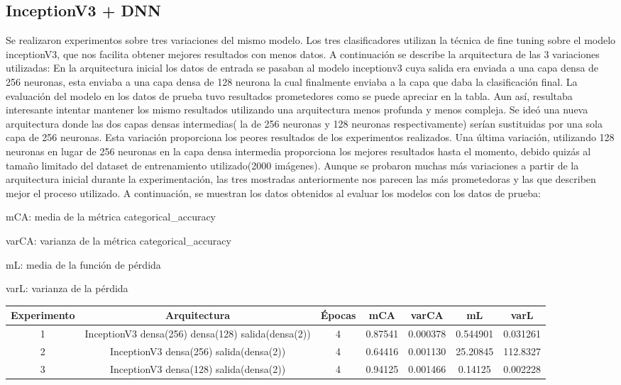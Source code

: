 \documentclass[article]{llncs}
\begin{document}
\subsection{InceptionV3 + DNN}

Se realizaron experimentos sobre tres variaciones del mismo modelo. Los tres clasificadores utilizan la técnica de fine tuning
sobre el modelo inceptionV3, que nos facilita obtener mejores resultados con menos datos. A continuación se describe la 
arquitectura de las 3 variaciones utilizadas:  
En la arquitectura inicial los datos de entrada se pasaban al modelo inceptionv3 cuya salida era enviada a una capa densa de 
256 neuronas, esta enviaba a una capa densa de 128 neurona la cual finalmente enviaba a la capa que daba la clasificación 
final. La evaluación del modelo en los datos de prueba tuvo resultados prometedores como se puede apreciar en la tabla. Aun 
así, resultaba interesante intentar mantener los mismo resultados utilizando una arquitectura menos profunda y menos 
compleja. Se ideó una nueva arquitectura donde las dos capas densas intermedias( la de 256 neuronas y 128 neuronas 
respectivamente) serían sustituidas por una sola capa de 256 neuronas. Esta variación proporciona los peores resultados de 
los experimentos realizados. Una última variación, utilizando 128 neuronas en lugar de 256 neuronas en la capa densa 
intermedia proporciona los mejores resultados hasta el momento, debido quizás al tamaño limitado del dataset de entrenamiento 
utilizado(2000 imágenes). Aunque se probaron muchas más variaciones a partir de la arquitectura inicial durante la 
experimentación, las tres mostradas anteriormente nos parecen las más prometedoras y las que describen mejor el proceso 
utilizado.  
A continuación, se muestran los datos obtenidos al evaluar los modelos con los datos de prueba:

mCA: media de la métrica categorical\_accuracy

varCA: varianza de la métrica categorical\_accuracy  

mL: media de la función de pérdida

varL: varianza de la pérdida

\begin{table}[h]
    \centering
    \begin{tabular}{|c|c|c|c|c|c|c|}
    \hline
    Experimento & Arquitectura & Épocas & mCA & varCA & mL & varL \\
    \hline
    1 & InceptionV3 densa(256) densa(128) salida(densa(2)) & 4 & 0.87541 & 0.000378 & 0.544901 & 0.031261 \\
    2 & InceptionV3 densa(256) salida(densa(2)) & 4 & 0.64416 & 0.001130 & 25.20845 & 112.8327 \\
    3 & InceptionV3 densa(128) salida(densa(2)) & 4 & 0.94125 & 0.001466 & 0.14125 & 0.002228 \\
    \hline
    \end{tabular}
\end{table}
\end{document}
